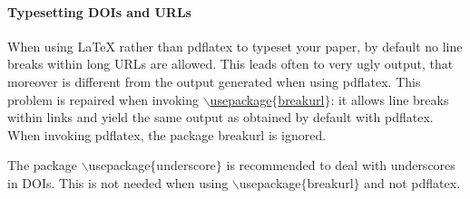 \documentclass[submission,copyright,creativecommons]{eptcs}
\begin{document}
\paragraph{Typesetting DOIs and URLs}

When using {\LaTeX} rather than {\ttfamily pdflatex} to typeset your paper, by
default no line breaks within long URLs are allowed. This leads often
to very ugly output, that moreover is different from the output
generated when using {\ttfamily pdflatex}. This problem is repaired when
invoking \href{http://eptcs.web.cse.unsw.edu.au/breakurl.sty}
{\ttfamily $\backslash$usepackage$\{$breakurl$\}$}: it allows line breaks
within links and yield the same output as obtained by default with
{\ttfamily pdflatex}.
When invoking {\ttfamily pdflatex}, the package {\ttfamily breakurl} is ignored.

The package {\ttfamily $\backslash$usepackage$\{$underscore$\}$} is
recommended to deal with underscores in DOIs. This is not needed when
using {\ttfamily $\backslash$usepackage$\{$breakurl$\}$} and not {\ttfamily pdflatex}.






\end{document}

